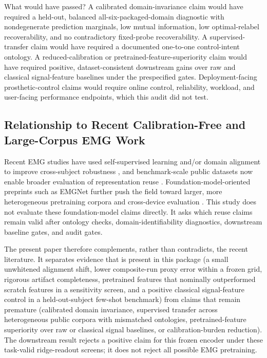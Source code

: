 \documentclass[journal]{IEEEtran}
\begin{document}
What would have passed? A calibrated domain-invariance claim would have required a held-out, balanced all-six-packaged-domain diagnostic with nondegenerate prediction marginals, low mutual information, low optimal-relabel recoverability, and no contradictory fixed-probe recoverability. A supervised-transfer claim would have required a documented one-to-one control-intent ontology. A reduced-calibration or pretrained-feature-superiority claim would have required positive, dataset-consistent downstream gains over raw and classical signal-feature baselines under the prespecified gates. Deployment-facing prosthetic-control claims would require online control, reliability, workload, and user-facing performance endpoints, which this audit did not test.

\subsection{Relationship to Recent Calibration-Free and Large-Corpus EMG Work}
Recent EMG studies have used self-supervised learning and/or domain alignment to improve cross-subject robustness \cite{yang2025calibrationfree,raghu2025vicregemg}, and benchmark-scale public datasets now enable broader evaluation of representation reuse \cite{sivakumar2024emg2qwerty,salter2024emg2pose}. Foundation-model-oriented preprints such as EMGNet further push the field toward larger, more heterogeneous pretraining corpora and cross-device evaluation \cite{kurbis2025emgnet}. This study does not evaluate these foundation-model claims directly. It asks which reuse claims remain valid after ontology checks, domain-identifiability diagnostics, downstream baseline gates, and audit gates.

The present paper therefore complements, rather than contradicts, the recent literature. It separates evidence that is present in this package (a small unwhitened alignment shift, lower composite-run proxy error within a frozen grid, rigorous artifact completeness, pretrained features that nominally outperformed scratch features in a sensitivity screen, and a positive classical signal-feature control in a held-out-subject few-shot benchmark) from claims that remain premature (calibrated domain invariance, supervised transfer across heterogeneous public corpora with mismatched ontologies, pretrained-feature superiority over raw or classical signal baselines, or calibration-burden reduction). The downstream result rejects a positive claim for this frozen encoder under these task-valid ridge-readout screens; it does not reject all possible EMG pretraining.
\end{document}

